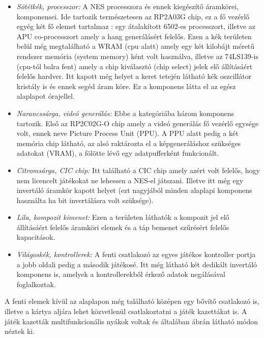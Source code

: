 \begin{itemize}
	\item \emph{Sötétkék, processzor:} A NES processzora és ennek kiegészítő áramkörei, komponensei. Ide tartozik természetesen az RP2A03G chip, ez a fő vezérlő egyég két fő elemet tartalmaz : egy átalakított 6502-es processzort, illetve az APU co-processzort amely a hang generálásért felelős. Ezen a kék területen belül még megtalálható a WRAM (cpu alatt) amely egy két kilobájt méretű rendszer memória (system memory) ként volt használva, illetve az 74LS139-is (cpu-tól balra fent) amely a chip kiválasztó (chip select) jelek elő állításáért felelős hardver. Itt kapott még helyet a keret tetején látható kék oszcillátor kristály is és ennek segéd áram köre. Ez a komponens látta el az egész alaplapot órajellel.
	\item \emph{Narancssárga, videó generálás:} Ebbe a kategóriába három komponens tartozik. Első az RP2C02G-O chip amely a videó generálás fő vezérlő egysége volt, ennek neve Picture Process Unit (PPU). A PPU alatt pedig a két memória chip látható, az alsó raktározta el a képgeneráláshoz szükséges adatokat (VRAM), a fölötte lévő egy adatpufferként funkcionált.
	\item \emph{Citromsárga, CIC chip:} Itt található a CIC chip amely azért volt felelős, hogy nem licencelt játékokat ne lehessen a NES-el játszani. Illetve itt még egy invertáló áramkör kapott helyet (ezt nagyjából minden alaplapi komponens használta ha bit invertálásra volt szüksége). 
	\item \emph{Lila, kompozit kimenet:} Ezen a területen láthatók a kompozit jel elő állításáért felelős áramköri elemek és a táp bemenet szűrésért felelős kapacitások.
	\item \emph{Világoskék, kontrollerek:} A fenti csatlakozó az egyes játékos kontroller portja a jobb oldali pedig a második játékosé. Itt még látható két dedikált invertáló komponens is, amelyek a kontrollerekből érkező adatok negálásával foglalkoztak.
\end{itemize}

A fenti elemek kívül az alaplapon még található középen egy bővítő csatlakozó is, illetve a kártya aljára lehet közvetlenül csatlakoztatni a játék kazettákat is. A játék kazetták multifunkcionális nyákok voltak és általában  ábrán látható módon néztek ki. 

